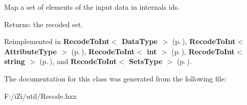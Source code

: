 Map a set of elements of the input data in internals ids. 

\begin{Desc}
\item[Returns:]the recoded set. \end{Desc}


Reimplemented in {\bf Recode\-To\-Int$<$ Data\-Type $>$} {\rm (p.\,\pageref{class_recode_to_int_7d3d3ea423abd8e055ba4483744fba04})}, {\bf Recode\-To\-Int$<$ Attribute\-Type $>$} {\rm (p.\,\pageref{class_recode_to_int_7d3d3ea423abd8e055ba4483744fba04})}, {\bf Recode\-To\-Int$<$ int $>$} {\rm (p.\,\pageref{class_recode_to_int_7d3d3ea423abd8e055ba4483744fba04})}, {\bf Recode\-To\-Int$<$ string $>$} {\rm (p.\,\pageref{class_recode_to_int_7d3d3ea423abd8e055ba4483744fba04})}, and {\bf Recode\-To\-Int$<$ Sets\-Type $>$} {\rm (p.\,\pageref{class_recode_to_int_7d3d3ea423abd8e055ba4483744fba04})}.

The documentation for this class was generated from the following file:\begin{CompactItemize}
\item 
F:/i\-Zi/util/Recode.hxx\end{CompactItemize}

